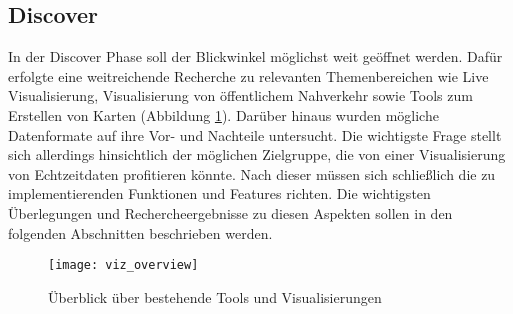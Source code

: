 \begin{newpage}
  \section{Discover}
  \label{sec:discover}
    In der Discover Phase soll der Blickwinkel möglichst weit geöffnet werden.
    Dafür erfolgte eine weitreichende Recherche zu relevanten Themenbereichen wie Live Visualisierung, Visualisierung von öffentlichem Nahverkehr sowie Tools zum Erstellen von Karten (Abbildung \ref{fig:viz_overview}). Darüber hinaus wurden mögliche Datenformate auf ihre Vor- und Nachteile untersucht. Die wichtigste Frage stellt sich allerdings hinsichtlich der möglichen Zielgruppe, die von einer Visualisierung von Echtzeitdaten profitieren könnte. Nach dieser müssen sich schließlich die zu implementierenden Funktionen und Features richten. Die wichtigsten Überlegungen und Rechercheergebnisse zu diesen Aspekten sollen in den folgenden Abschnitten beschrieben werden.

    \begin{figure}[htbp]
      \begin{center}
        \texttt{[image: viz\_overview]}
        \caption{Überblick über bestehende Tools und Visualisierungen}
        \label{fig:viz_overview}
      \end{center}
    \end{figure}

    
    
    

\end{newpage}